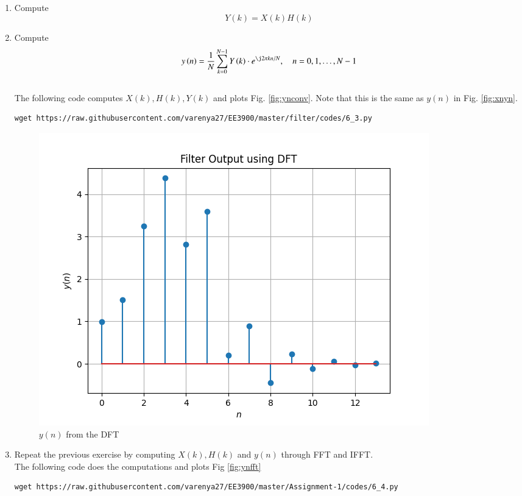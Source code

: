 \documentclass[journal,12pt,twocolumn]{IEEEtran}
\renewcommand\thesection{\arabic{section}}
\begin{document}
\begin{enumerate}[label=\thesection.\arabic*]
\item Compute 
\begin{equation}
Y(k) = X(k)H(k)
\end{equation}
\item Compute
\begin{equation}
 y\brak{n}={\frac {1}{N}}\sum _{k=0}^{N-1}Y\brak{k}\cdot e^{\j 2\pi kn/N},\quad n = 0,1,\dots, N-1
\end{equation}
\\
\solution The following code computes $X(k), H(k), Y(k)$ and plots Fig. \ref{fig:ynconv}. Note that this is the same as 
$y(n)$ in  Fig. 
\ref{fig:xnyn}. 
%
\begin{lstlisting}
wget https://raw.githubusercontent.com/varenya27/EE3900/master/filter/codes/6_3.py
\end{lstlisting}
\begin{figure}[!ht]
\centering
\includegraphics[width=\columnwidth]{./figures/Figure_6}
\caption{$y(n)$ from the DFT}
\label{fig:yndft}
\end{figure}
\item Repeat the previous exercise by computing $X(k), H(k)$ and $y(n)$ through FFT and 
IFFT.\\
\solution The following code does the computations and plots Fig \ref{fig:ynfft}
\begin{lstlisting}
wget https://raw.githubusercontent.com/varenya27/EE3900/master/Assignment-1/codes/6_4.py
\end{lstlisting}
\begin{figure}[!ht]
\centering

\end{figure}
\end{enumerate}
\end{document}
